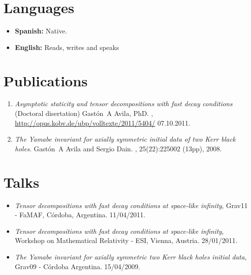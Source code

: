 \documentclass[a4paper]{article}
\begin{document}
\section{Languages}
\begin{itemize}
 \item \textbf{Spanish:} Native.
 \item \textbf{English:} Reads, writes and speaks
\end{itemize}

\section{Publications}
\begin{enumerate}
\item \newblock \emph{Asymptotic staticity and tensor decompositions with fast
decay conditions}
\newblock (Doctoral disertation)
\newblock Gast\'{o}n~A Avila, PhD.
,
\url{http://opus.kobv.de/ubp/volltexte/2011/5404/} 07.10.2011.

\item \newblock \emph{The Yamabe invariant for axially symmetric initial data of
two Kerr black holes.}
\newblock Gast\'{o}n~A Avila and Sergio Dain.
, 25(22):225002 (13pp), 2008.
\end{enumerate}

\section{Talks}
\begin{itemize}
 \item \emph{Tensor decompositions with fast decay conditions at space-like
infinity}, Grav11 - FaMAF, Córdoba, Argentina. 11/04/2011.
 \item \emph{Tensor decompositions with fast decay conditions at space-like
infinity}, Workshop on Mathematical Relativity - ESI, Vienna, Austria.
28/01/2011.
 \item \emph{The Yamabe invariant for axially symmetric two Kerr black
holes initial data}, Grav09 - Córdoba Argentina. 15/04/2009.
\end{itemize}
\end{document}

